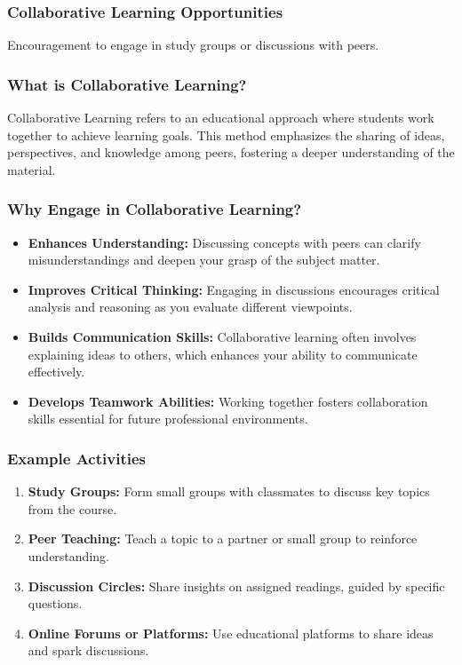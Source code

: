 \documentclass[aspectratio=169]{beamer}
\begin{document}
\begin{frame}[fragile]
    \frametitle{Collaborative Learning Opportunities}
    Encouragement to engage in study groups or discussions with peers.
\end{frame}

\begin{frame}[fragile]
    \frametitle{What is Collaborative Learning?}
    Collaborative Learning refers to an educational approach where students work together to achieve learning goals. This method emphasizes the sharing of ideas, perspectives, and knowledge among peers, fostering a deeper understanding of the material.
\end{frame}

\begin{frame}[fragile]
    \frametitle{Why Engage in Collaborative Learning?}
    \begin{itemize}
        \item \textbf{Enhances Understanding:} Discussing concepts with peers can clarify misunderstandings and deepen your grasp of the subject matter.
        \item \textbf{Improves Critical Thinking:} Engaging in discussions encourages critical analysis and reasoning as you evaluate different viewpoints.
        \item \textbf{Builds Communication Skills:} Collaborative learning often involves explaining ideas to others, which enhances your ability to communicate effectively.
        \item \textbf{Develops Teamwork Abilities:} Working together fosters collaboration skills essential for future professional environments.
    \end{itemize}
\end{frame}

\begin{frame}[fragile]
    \frametitle{Example Activities}
    \begin{enumerate}
        \item \textbf{Study Groups:} Form small groups with classmates to discuss key topics from the course.
        \item \textbf{Peer Teaching:} Teach a topic to a partner or small group to reinforce understanding.
        \item \textbf{Discussion Circles:} Share insights on assigned readings, guided by specific questions.
        \item \textbf{Online Forums or Platforms:} Use educational platforms to share ideas and spark discussions.
    \end{enumerate}
\end{frame}
\end{document}
